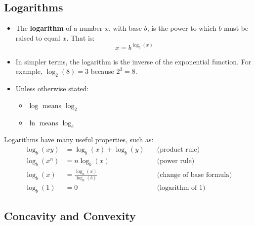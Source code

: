 \subsection{Logarithms}

\begin{itemize}
    \item The \textbf{logarithm} of a number \( x \), with base \( b \), is the power to which \( b \) must be raised to equal \( x \). That is:
          \[
              x = b^{\log_b(x)}
          \]
    \item In simpler terms, the logarithm is the inverse of the exponential function. For example, \( \log_2(8) = 3 \) because \( 2^3 = 8 \).
    \item Unless otherwise stated:
          \begin{itemize}
              \item \( \log \) means \( \log_2 \)
              \item \( \ln \) means \( \log_e \)
          \end{itemize}
\end{itemize}

Logarithms have many useful properties, such as:
\[
    \begin{aligned}
        \log_b(xy)  & = \log_b(x) + \log_b(y) \quad       & \text{(product rule)}           \\
        \log_b(x^n) & = n \log_b(x) \quad                 & \text{(power rule)}             \\
        \log_b(x)   & = \frac{\log_a(x)}{\log_a(b)} \quad & \text{(change of base formula)} \\
        \log_b(1)   & = 0 \quad                           & \text{(logarithm of 1)}
    \end{aligned}
\]








\newpage
\subsection{Concavity and Convexity}

